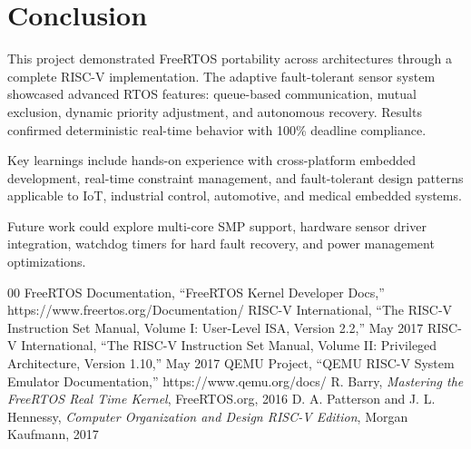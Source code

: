 \documentclass[conference]{IEEEtran}
\begin{document}
\section{Conclusion}

This project demonstrated FreeRTOS portability across architectures through a complete RISC-V implementation. The adaptive fault-tolerant sensor system showcased advanced RTOS features: queue-based communication, mutual exclusion, dynamic priority adjustment, and autonomous recovery. Results confirmed deterministic real-time behavior with 100\% deadline compliance.

Key learnings include hands-on experience with cross-platform embedded development, real-time constraint management, and fault-tolerant design patterns applicable to IoT, industrial control, automotive, and medical embedded systems.

Future work could explore multi-core SMP support, hardware sensor driver integration, watchdog timers for hard fault recovery, and power management optimizations.

\begin{thebibliography}{00}
 FreeRTOS Documentation, ``FreeRTOS Kernel Developer Docs,'' https://www.freertos.org/Documentation/
 RISC-V International, ``The RISC-V Instruction Set Manual, Volume I: User-Level ISA, Version 2.2,'' May 2017
 RISC-V International, ``The RISC-V Instruction Set Manual, Volume II: Privileged Architecture, Version 1.10,'' May 2017
 QEMU Project, ``QEMU RISC-V System Emulator Documentation,'' https://www.qemu.org/docs/
 R. Barry, \textit{Mastering the FreeRTOS Real Time Kernel}, FreeRTOS.org, 2016
 D. A. Patterson and J. L. Hennessy, \textit{Computer Organization and Design RISC-V Edition}, Morgan Kaufmann, 2017
\end{thebibliography}
\end{document}
